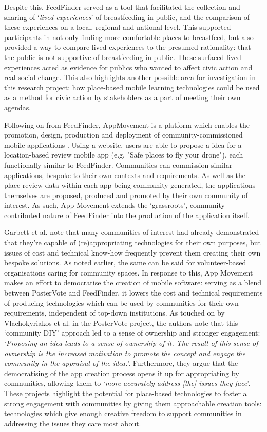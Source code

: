 Despite this, FeedFinder served as a tool that facilitated the collection and sharing of `\textit{lived experiences}' of breastfeeding in public, and the comparison of these experiences on a local, regional and national level. This supported participants in not only finding more comfortable places to breastfeed, but also provided a way to compare lived experiences to the presumed rationality: that the public is not supportive of breastfeeding in public. These surfaced lived experiences acted as evidence for publics who wanted to affect civic action and real social change. This also highlights another possible area for investigation in this research project: how place-based mobile learning technologies could be used as a method for civic action by stakeholders as a part of meeting their own agendas.

Following on from FeedFinder, AppMovement is a platform which enables the promotion, design, production and deployment of community-commissioned mobile applications \citep{Garbett2016}. Using a website, users are able to propose a idea for a location-based review mobile app (e.g. "Safe places to fly your drone"), each functionally similar to FeedFinder. Communities can commission similar applications, bespoke to their own contexts and requirements. As well as the place review data within each app being community generated, the applications themselves are proposed, produced and promoted by their own community of interest. As such, App Movement extends the `grassroots', community-contributed nature of FeedFinder into the production of the application itself. 

Garbett et al. note that many communities of interest had already demonstrated that they're capable of (re)appropriating technologies for their own purposes, but issues of cost and technical know-how frequently prevent them creating their own bespoke solutions. As noted earlier, the same can be said for volunteer-based organisations caring for community spaces. In response to this, App Movement makes an effort to democratise the creation of mobile software: serving as a blend between PosterVote and FeedFinder, it lowers the cost and technical requirements of producing technologies which can be used by communities for their own requirements, independent of top-down institutions. As touched on by Vlachokyriakos et al. in the PosterVote project, the authors note that this `community DIY' approach led to a sense of ownership and stronger engagement: `\textit{Proposing an idea leads to a sense of ownership of it. The result of this sense of ownership is the increased motivation to promote the concept and engage the community in the appraisal of the idea.}'. Furthermore, they argue that the democratising of the app creation process opens it up for appropriating by communities, allowing them to `\textit{more accurately address [the] issues they face}'. These projects highlight the potential for place-based technologies to foster a strong engagement with communities by giving them approachable creation tools: technologies which give enough creative freedom to support communities in addressing the issues they care most about.

